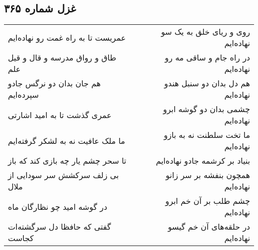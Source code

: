 \begin{center}
\section*{غزل شماره ۳۶۵}
\label{sec:sh365}
\begin{longtable}{l p{0.5cm} r}
عمریست تا به راه غمت رو نهاده‌ایم
&&
روی و ریای خلق به یک سو نهاده‌ایم
\\
طاق و رواق مدرسه و قال و قیل علم
&&
در راه جام و ساقی مه رو نهاده‌ایم
\\
هم جان بدان دو نرگس جادو سپرده‌ایم
&&
هم دل بدان دو سنبل هندو نهاده‌ایم
\\
عمری گذشت تا به امید اشارتی
&&
چشمی بدان دو گوشه ابرو نهاده‌ایم
\\
ما ملک عافیت نه به لشکر گرفته‌ایم
&&
ما تخت سلطنت نه به بازو نهاده‌ایم
\\
تا سحر چشم یار چه بازی کند که باز
&&
بنیاد بر کرشمه جادو نهاده‌ایم
\\
بی زلف سرکشش سر سودایی از ملال
&&
همچون بنفشه بر سر زانو نهاده‌ایم
\\
در گوشه امید چو نظارگان ماه
&&
چشم طلب بر آن خم ابرو نهاده‌ایم
\\
گفتی که حافظا دل سرگشته‌ات کجاست
&&
در حلقه‌های آن خم گیسو نهاده‌ایم
\\
\end{longtable}
\end{center}

